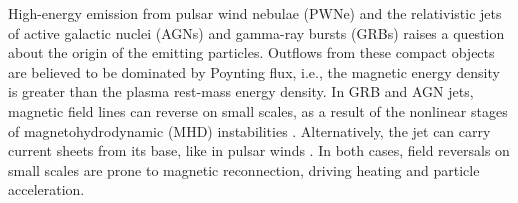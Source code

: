 \documentclass[twocolumn,twocolappendix]{aastex63}
\begin{document}
High-energy emission from pulsar wind nebulae (PWNe) and the relativistic jets of active galactic nuclei (AGNs) and gamma-ray bursts (GRBs) raises a question about the origin of the emitting particles. 
Outflows from these compact objects are believed to be dominated by Poynting flux, i.e., the magnetic energy density is greater than the plasma rest-mass energy density. In GRB and AGN jets, magnetic field lines can reverse on small scales, as a  result of the nonlinear stages of magnetohydrodynamic (MHD) instabilities \citep[][]{romanova_92,begelman_98,spruit_01,lyutikov_03,giannios_spruit_06,bottcher_19}. Alternatively, the jet can carry current sheets from its base, like in pulsar winds \citep[][]{lyubarsky_kirk_01,drenkhahn_02a,drenkhahn_02b,kirk_sk_03,giannios_uzdensky_19,cerutti_20}. In both cases, field reversals on small scales are prone to magnetic reconnection, driving heating and particle acceleration.
\end{document}
